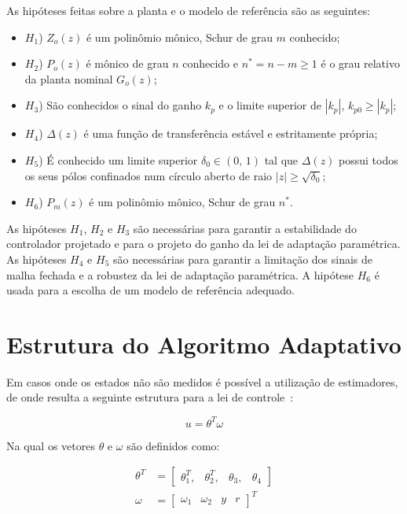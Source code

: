     As hipóteses feitas sobre a planta e o modelo de referência são as seguintes:

    \begin{itemize}
        \item[] $H_1$) $Z_o(z)$ é um polinômio mônico, Schur de grau $m$ conhecido;
        \item[] $H_2$) $P_o(z)$ é mônico de grau $n$ conhecido e $n^* = n - m \geq 1$ é o grau
            relativo da planta nominal $G_o(z)$;
        \item[] $H_3$) São conhecidos o sinal do ganho $k_p$ e o limite superior de $|k_p|$,
            $k_{p0} \geq |k_p|$;
        \item[] $H_4$) $\Delta(z)$ é uma função de transferência estável e estritamente
            própria;
        \item[] $H_5$) É conhecido um limite superior $\delta_0 \in (0, \, 1)$ tal que
            $\Delta(z)$ possui todos os seus pólos confinados num círculo aberto de
            raio $|z| \geq \sqrt{\delta_0}$;
        \item[] $H_6$) $P_m(z)$ é um polinômio mônico, Schur de grau $n^*$.
    \end{itemize}

    As hipóteses $H_1$, $H_2$ e $H_3$ são necessárias para garantir a estabilidade do
    controlador projetado e para o projeto do ganho da lei de adaptação paramétrica.
    As hipóteses $H_4$ e $H_5$ são necessárias para garantir a limitação dos sinais
    de malha fechada e a robustez da lei de adaptação paramétrica. A hipótese $H_6$
    é usada para a escolha de um modelo de referência adequado.

    \section{Estrutura do Algoritmo Adaptativo}

    Em casos onde os estados não são medidos é possível a utilização de estimadores,
    de onde resulta a seguinte estrutura para a lei de controle~\cite{ref:TAO}:

    \begin{equation}
        u = \theta^T \omega
    \end{equation}

    Na qual os vetores $\theta$ e $\omega$ são definidos como:

    \begin{equation}
        \begin{split}
            \theta^T & = \left[ \begin{matrix} \theta_1^T, & \theta_2^T, & \theta_3, & \theta_4
                \end{matrix} \right]\\
            \omega & = {\left[ \begin{matrix} \omega_1 & \omega_2 & y & r \end{matrix}
                \right]}^T
        \end{split}
    \end{equation}

